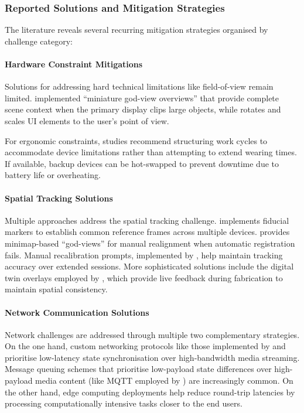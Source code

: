 \subsubsection{Reported Solutions and Mitigation Strategies}

The literature reveals several recurring mitigation strategies organised by challenge category:

\paragraph{Hardware Constraint Mitigations}

Solutions for addressing hard technical limitations like field-of-view remain limited. \cite{aschenbrenner2018collaborative} implemented ``miniature god-view overviews'' that provide complete scene context when the primary display clips large objects, while \cite{schmidt2022augmentedReality} rotates and scales UI elements to the user's point of view.

For ergonomic constraints, studies recommend structuring work cycles to accommodate device limitations rather than attempting to extend wearing times. If available, backup devices can be hot-swapped to prevent downtime due to battery life or overheating\cite{yang2023usability}.

\paragraph{Spatial Tracking Solutions}

Multiple approaches address the spatial tracking challenge. \cite{martins2024multiUser} implements fiducial markers to establish common reference frames across multiple devices. \cite{aschenbrenner2018collaborative} provides minimap-based ``god-views'' for manual realignment when automatic registration fails.  Manual recalibration prompts, implemented by \cite{chan2022design}, help maintain tracking accuracy over extended sessions. More sophisticated solutions include the digital twin overlays employed by \cite{buyruk2022interactive}, which provide live feedback during fabrication to maintain spatial consistency.

\paragraph{Network Communication Solutions}

Network challenges are addressed through multiple two complementary strategies. On the one hand, custom networking protocols like those implemented by \cite{vidalBalea2020creating} and \cite{wang2022crossPlatform} prioritise low-latency state synchronisation over high-bandwidth media streaming. Message queuing schemes that prioritise low-payload state differences over high-payload media content (like MQTT employed by \cite{schmidt2022augmentedReality}) are increasingly common. On the other hand, edge computing deployments help reduce round-trip latencies by processing computationally intensive tasks closer to the end users.

